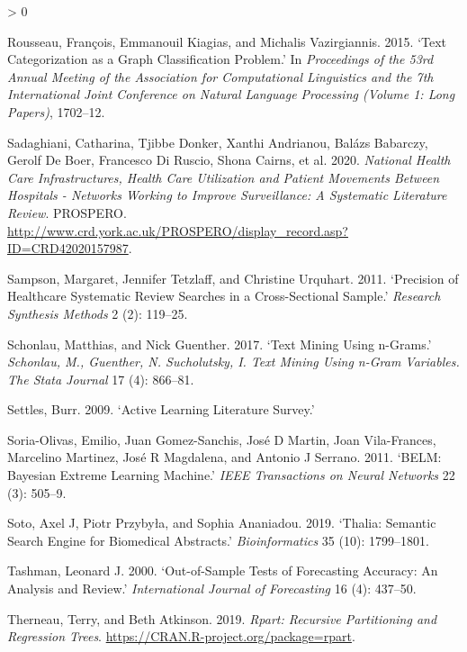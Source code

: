 \documentclass{article}
\newlength{\cslhangindent}
\newenvironment{CSLReferences}[2] %
 {%
  \setlength{\parindent}{0pt}
  \ifodd #1 \everypar{\setlength{\hangindent}{\cslhangindent}}\ignorespaces\fi
  \ifnum #2 > 0
  \setlength{\parskip}{#2\baselineskip}
  \fi
 }%
 {}
\begin{document}
\begin{CSLReferences}{1}{0}
\leavevmode\hypertarget{ref-rousseau2015text}{}%
Rousseau, François, Emmanouil Kiagias, and Michalis Vazirgiannis. 2015.
{`Text Categorization as a Graph Classification Problem.'} In
\emph{Proceedings of the 53rd Annual Meeting of the Association for
Computational Linguistics and the 7th International Joint Conference on
Natural Language Processing (Volume 1: Long Papers)}, 1702--12.

\leavevmode\hypertarget{ref-newis}{}%
Sadaghiani, Catharina, Tjibbe Donker, Xanthi Andrianou, Balázs Babarczy,
Gerolf De Boer, Francesco Di Ruscio, Shona Cairns, et al. 2020.
\emph{National Health Care Infrastructures, Health Care Utilization and
Patient Movements Between Hospitals - Networks Working to Improve
Surveillance: A Systematic Literature Review}. PROSPERO.
\url{http://www.crd.york.ac.uk/PROSPERO/display_record.asp?ID=CRD42020157987}.

\leavevmode\hypertarget{ref-sampson2011precision}{}%
Sampson, Margaret, Jennifer Tetzlaff, and Christine Urquhart. 2011.
{`Precision of Healthcare Systematic Review Searches in a
Cross-Sectional Sample.'} \emph{Research Synthesis Methods} 2 (2):
119--25.

\leavevmode\hypertarget{ref-schonlau2017text}{}%
Schonlau, Matthias, and Nick Guenther. 2017. {`Text Mining Using
n-Grams.'} \emph{Schonlau, M., Guenther, N. Sucholutsky, I. Text Mining
Using n-Gram Variables. The Stata Journal} 17 (4): 866--81.

\leavevmode\hypertarget{ref-settles2009active}{}%
Settles, Burr. 2009. {`Active Learning Literature Survey.'}

\leavevmode\hypertarget{ref-soria2011belm}{}%
Soria-Olivas, Emilio, Juan Gomez-Sanchis, José D Martin, Joan
Vila-Frances, Marcelino Martinez, José R Magdalena, and Antonio J
Serrano. 2011. {`BELM: Bayesian Extreme Learning Machine.'} \emph{IEEE
Transactions on Neural Networks} 22 (3): 505--9.

\leavevmode\hypertarget{ref-soto2019thalia}{}%
Soto, Axel J, Piotr Przybyła, and Sophia Ananiadou. 2019. {`Thalia:
Semantic Search Engine for Biomedical Abstracts.'} \emph{Bioinformatics}
35 (10): 1799--1801.

\leavevmode\hypertarget{ref-tashman2000out}{}%
Tashman, Leonard J. 2000. {`Out-of-Sample Tests of Forecasting Accuracy:
An Analysis and Review.'} \emph{International Journal of Forecasting} 16
(4): 437--50.

\leavevmode\hypertarget{ref-rpart}{}%
Therneau, Terry, and Beth Atkinson. 2019. \emph{Rpart: Recursive
Partitioning and Regression Trees}.
\url{https://CRAN.R-project.org/package=rpart}.


\end{CSLReferences}
\end{document}
